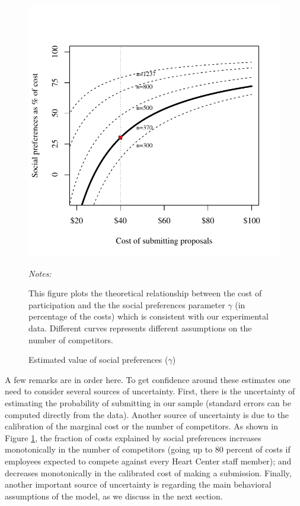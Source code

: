 \documentclass[12pt, titlepage]{article}
\newenvironment{tablenotes}[1][]{
  \begin{minipage}{\textwidth}\emph{Notes:}{\footnotesize #1}
}{\end{minipage}}
\begin{document}
\begin{figure} 
\centering
\caption{Estimated value of social preferences ($\hat\gamma$)}
\label{fig: gamma}
\includegraphics{figures/gamma-1.pdf}
\begin{tablenotes}
This figure plots the theoretical relationship between the cost of participation and the the social preferences parameter $\gamma$ (in percentage of the costs) which is consistent with our experimental data. Different curves represents different assumptions on the number of competitors. 
\end{tablenotes}
\end{figure}

A few remarks are in order here. To get confidence around these
estimates one need to consider several sources of uncertainty. First,
there is the uncertainty of estimating the probability of submitting in
our sample (standard errors can be computed directly from the data).
Another source of uncertainty is due to the calibration of the marginal
cost or the number of competitors. As shown in Figure \ref{fig: gamma},
the fraction of costs explained by social preferences increases
monotonically in the number of competitors (going up to 80 percent of
costs if employees expected to compete against every Heart Center staff
member); and decreases monotonically in the calibrated cost of making a
submission. Finally, another important source of uncertainty is
regarding the main behavioral assumptions of the model, as we discuss in
the next section.
\end{document}
